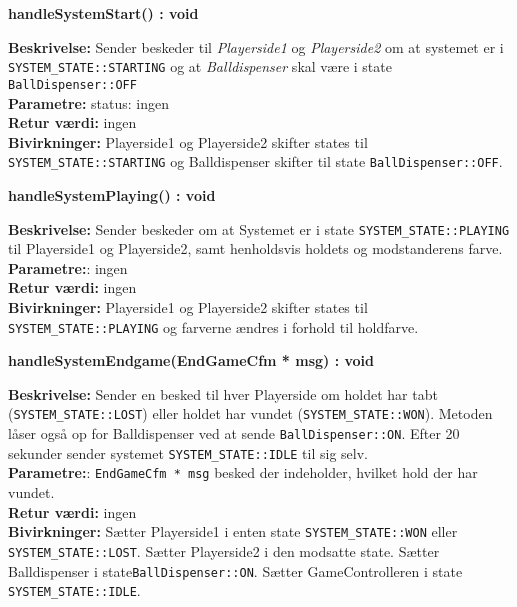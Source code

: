 \documentclass[Softwaredesign/Softwaredesign_main.tex]{subfiles}
\begin{document}
\textbf{handleSystemStart() : void}
\begin{adjustwidth}{1cm}{0pt}
\textbf{Beskrivelse:} Sender beskeder til \textit{Playerside1} og  \textit{Playerside2} om at systemet er i \lstinline{SYSTEM_STATE::STARTING} og at \textit{Balldispenser} skal være i state \lstinline{BallDispenser::OFF}\\[0.2cm]
\textbf{Parametre:} status: ingen \\[0.2cm]
\textbf{Retur værdi:} ingen \\[0.2cm]
\textbf{Bivirkninger:} Playerside1 og Playerside2 skifter states til \lstinline{SYSTEM_STATE::STARTING} og Balldispenser skifter til state \lstinline{BallDispenser::OFF}.  \\[0.2cm]
\end{adjustwidth}

\textbf{handleSystemPlaying() : void}
\begin{adjustwidth}{1cm}{0pt}
\textbf{Beskrivelse:} Sender beskeder om at Systemet er i state \lstinline{SYSTEM_STATE::PLAYING} til Playerside1 og Playerside2, samt henholdsvis holdets og modstanderens farve.\\[0.2cm]
\textbf{Parametre:}: ingen \\[0.2cm]
\textbf{Retur værdi:} ingen \\[0.2cm]
\textbf{Bivirkninger:}  Playerside1 og Playerside2 skifter states til \lstinline{SYSTEM_STATE::PLAYING} og farverne ændres i forhold til holdfarve. \\[0.2cm]
\end{adjustwidth}

\textbf{handleSystemEndgame(EndGameCfm * msg) : void}
\begin{adjustwidth}{1cm}{0pt}
\textbf{Beskrivelse:} Sender en besked til hver Playerside om holdet har tabt (\lstinline{SYSTEM_STATE::LOST}) eller holdet har vundet (\lstinline{SYSTEM_STATE::WON}). Metoden låser også op for Balldispenser ved at sende \lstinline{BallDispenser::ON}. Efter 20 sekunder sender systemet \lstinline{SYSTEM_STATE::IDLE} til sig selv. \\[0.2cm]
\textbf{Parametre:}: \lstinline{EndGameCfm * msg} besked der indeholder, hvilket hold der har vundet. \\[0.2cm]
\textbf{Retur værdi:} ingen \\[0.2cm]
\textbf{Bivirkninger:} Sætter Playerside1 i enten state \lstinline{SYSTEM_STATE::WON} eller \lstinline{SYSTEM_STATE::LOST}. Sætter Playerside2 i den modsatte state. Sætter Balldispenser i state\lstinline{BallDispenser::ON}. Sætter GameControlleren i state \lstinline{SYSTEM_STATE::IDLE}. \\[0.2cm]
\end{adjustwidth}
\end{document}
